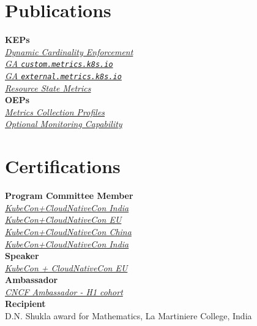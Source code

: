 \documentclass[]{rexagod-resume-openfont}
\begin{document}
\begin{minipage}[t]{0.33\textwidth}

\section{Publications}
\textbf{KEPs} \\
\textbullet{} \href{\dynamicCardinalityEnforcementUrl}{\emph{Dynamic Cardinality Enforcement}} \\
\textbullet{} \href{\customMetricsGaUrl}{\emph{GA \texttt{custom.metrics.k8s.io}}} \\
\textbullet{} \href{\externalMetricsGaUrl}{\emph{GA \texttt{external.metrics.k8s.io}}} \\
\textbullet{} \href{\resourceStateMetricsUrl}{\emph{Resource State Metrics}} \\
\textbf{OEPs} \\
\textbullet{} \href{\metricsCollectionProfilesUrl}{\emph{Metrics Collection Profiles}} \\
\textbullet{} \href{\optionalMonitoringCapabilityUrl}{\emph{Optional Monitoring Capability}} \\


\section{Certifications}
\textbf{Program Committee Member} \\
\textbullet{} \href{\kubeConIndiaTwoSixSpeakerUrl}{\emph{KubeCon+CloudNativeCon India}} \\
\textbullet{} \href{\kubeConEuropeSpeakerUrl}{\emph{KubeCon+CloudNativeCon EU}} \\
\textbullet{} \href{\kubeConChinaSpeakerUrl}{\emph{KubeCon+CloudNativeCon China}} \\
\textbullet{} \href{\kubeConIndiaTwoFourSpeakerUrl}{\emph{KubeCon+CloudNativeCon India}} \\
\textbf{Speaker} \\
\textbullet{} \href{\kubeConEuropeMaintainerUrl}{\emph{KubeCon + CloudNativeCon EU}} \\
\textbf{Ambassador} \\
\textbullet{} \href{\cncfAmbassadorUrl}{\emph{CNCF Ambassador - H1 cohort}} \\
\textbf{Recipient} \\
\textbullet{} D.N. Shukla award for Mathematics, La Martiniere College, India \\


\end{minipage}
\end{document}
